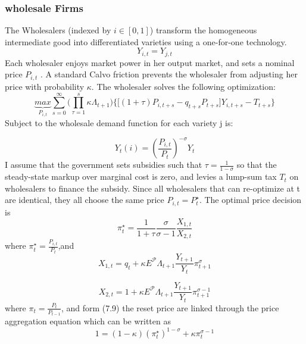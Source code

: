\documentclass[cn,10pt,math=newtx,citestyle=gb7714-2015,bibstyle=gb7714-2015]{elegantbook}
\begin{document}
{{			\subsubsection{wholesale Firms}
			The Wholesalers (indexed by $i \in [0, 1]$) transform the homogeneous intermediate good into differentiated varieties using a one-for-one technology.
			\begin{equation}
				Y_{i,t}=Y_{j,t}
			\end{equation}
			Each wholesaler enjoys market power in her output market, and sets a nominal price $P_{i,t}$ . A standard Calvo friction prevents the wholesaler from adjusting her price with probability $\kappa$. The wholesaler solves the following optimization:
			\begin{equation*}
				\underbrace{max}_{P_{i,t}}\sum_{s=0}^{\infty}\bigg(\prod_{\tau=1}^{s}\kappa \Lambda_{t+1}\bigg)\biggl\{\bigg[(1+\tau)P_{i,{t+s}}-q_{t+s}P_{t+s}\bigg]Y_{i,t+s}-T_{t+s}\biggr\}
			\end{equation*}
			Subject to the wholesale demand function for each variety j is:
			
			\begin{equation*}
				Y_t(i)=\left(\frac{P_{i,t}}{P_t}\right)^{-\sigma}Y_t
			\end{equation*}
			I assume that the government sets subsidies such that $\tau =\frac{1}{1-\sigma}$ so that the steady-state markup over marginal cost is zero, and levies a lump-sum tax $T_{t}$ on wholesalers to finance the subsidy. Since all wholesalers that can re-optimize at t are identical, they all choose the
			same price $P_{i,t} = P_t^\star$. The optimal price decision is
			\begin{equation}
				\pi_t^\star=\frac{1}{1+\tau}\frac{\sigma}{\sigma-1}\frac{X_{1,t}}{X_{2,t}}
			\end{equation}
			where $\pi_t^\star=\frac{P_{i,t}}{P_t}$,and
			\begin{equation}
				X_{1,t}=q_t+\kappa \mathit{E}^{\mathcal{P}}\Lambda_{t+1}\frac{Y_{t+1}}{Y_t}\pi_{t+1}^{\sigma}
			\end{equation}
			
			\begin{equation}
				X_{2,t}=1+\kappa \mathit{E}^{\mathcal{P}}\Lambda_{t+1}\frac{Y_{t+1}}{Y_t}\pi_{t+1}^{\sigma-1}
			\end{equation}
			where $\pi_t=\frac{P_t}{P_{t-1}}$, and form (7.9) the reset price are linked through the price aggregation equation which can be written as
			\begin{equation}
				1=(1-\kappa)(\pi_t^\star)^{1-\sigma}+\kappa \pi_t^{\sigma-1}
			\end{equation}
			
}}
\end{document}

